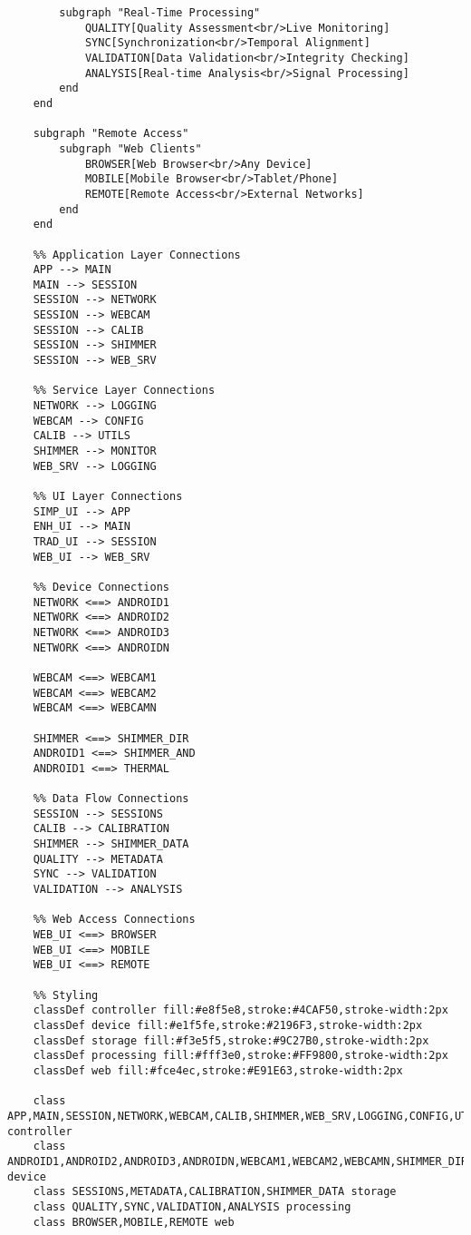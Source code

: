 \documentclass[12pt,a4paper]{article}
\begin{document}
\begin{verbatim}
        subgraph "Real-Time Processing"
            QUALITY[Quality Assessment<br/>Live Monitoring]
            SYNC[Synchronization<br/>Temporal Alignment]
            VALIDATION[Data Validation<br/>Integrity Checking]
            ANALYSIS[Real-time Analysis<br/>Signal Processing]
        end
    end
    
    subgraph "Remote Access"
        subgraph "Web Clients"
            BROWSER[Web Browser<br/>Any Device]
            MOBILE[Mobile Browser<br/>Tablet/Phone]
            REMOTE[Remote Access<br/>External Networks]
        end
    end
    
    %% Application Layer Connections
    APP --> MAIN
    MAIN --> SESSION
    SESSION --> NETWORK
    SESSION --> WEBCAM
    SESSION --> CALIB
    SESSION --> SHIMMER
    SESSION --> WEB_SRV
    
    %% Service Layer Connections
    NETWORK --> LOGGING
    WEBCAM --> CONFIG
    CALIB --> UTILS
    SHIMMER --> MONITOR
    WEB_SRV --> LOGGING
    
    %% UI Layer Connections
    SIMP_UI --> APP
    ENH_UI --> MAIN
    TRAD_UI --> SESSION
    WEB_UI --> WEB_SRV
    
    %% Device Connections
    NETWORK <==> ANDROID1
    NETWORK <==> ANDROID2
    NETWORK <==> ANDROID3
    NETWORK <==> ANDROIDN
    
    WEBCAM <==> WEBCAM1
    WEBCAM <==> WEBCAM2
    WEBCAM <==> WEBCAMN
    
    SHIMMER <==> SHIMMER_DIR
    ANDROID1 <==> SHIMMER_AND
    ANDROID1 <==> THERMAL
    
    %% Data Flow Connections
    SESSION --> SESSIONS
    CALIB --> CALIBRATION
    SHIMMER --> SHIMMER_DATA
    QUALITY --> METADATA
    SYNC --> VALIDATION
    VALIDATION --> ANALYSIS
    
    %% Web Access Connections
    WEB_UI <==> BROWSER
    WEB_UI <==> MOBILE
    WEB_UI <==> REMOTE
    
    %% Styling
    classDef controller fill:#e8f5e8,stroke:#4CAF50,stroke-width:2px
    classDef device fill:#e1f5fe,stroke:#2196F3,stroke-width:2px
    classDef storage fill:#f3e5f5,stroke:#9C27B0,stroke-width:2px
    classDef processing fill:#fff3e0,stroke:#FF9800,stroke-width:2px
    classDef web fill:#fce4ec,stroke:#E91E63,stroke-width:2px
    
    class APP,MAIN,SESSION,NETWORK,WEBCAM,CALIB,SHIMMER,WEB_SRV,LOGGING,CONFIG,UTILS,MONITOR,SIMP_UI,ENH_UI,TRAD_UI,WEB_UI controller
    class ANDROID1,ANDROID2,ANDROID3,ANDROIDN,WEBCAM1,WEBCAM2,WEBCAMN,SHIMMER_DIR,SHIMMER_AND,THERMAL device
    class SESSIONS,METADATA,CALIBRATION,SHIMMER_DATA storage
    class QUALITY,SYNC,VALIDATION,ANALYSIS processing
    class BROWSER,MOBILE,REMOTE web
\end{verbatim}
\end{document}
